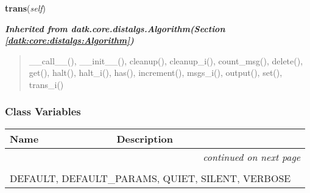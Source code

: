     \label{datk:core:distalgs:Synchronous_Algorithm:trans}

    \vspace{0.5ex}

\hspace{.8\funcindent}\begin{boxedminipage}{\funcwidth}

    \raggedright \textbf{trans}(\textit{self})

\setlength{\parskip}{2ex}
\setlength{\parskip}{1ex}
    \end{boxedminipage}


\large{\textbf{\textit{Inherited from datk.core.distalgs.Algorithm\textit{(Section \ref{datk:core:distalgs:Algorithm})}}}}

\begin{quote}
\_\_call\_\_(), \_\_init\_\_(), cleanup(), cleanup\_i(), count\_msg(), delete(), get(), halt(), halt\_i(), has(), increment(), msgs\_i(), output(), set(), trans\_i()
\end{quote}


  \subsubsection{Class Variables}

    \vspace{-1cm}
\hspace{\varindent}\begin{longtable}{|p{\varnamewidth}|p{\vardescrwidth}|l}
\cline{1-2}
\cline{1-2} \centering \textbf{Name} & \centering \textbf{Description}& \\
\cline{1-2}
\endhead\cline{1-2}\multicolumn{3}{r}{\small\textit{continued on next page}}\\\endfoot\cline{1-2}
\endlastfoot\multicolumn{2}{|l|}{\textit{Inherited from datk.core.distalgs.Algorithm \textit{(Section \ref{datk:core:distalgs:Algorithm})}}}\\
\multicolumn{2}{|p{\varwidth}|}{\raggedright DEFAULT, DEFAULT\_PARAMS, QUIET, SILENT, VERBOSE}\\
\cline{1-2}
\end{longtable}

